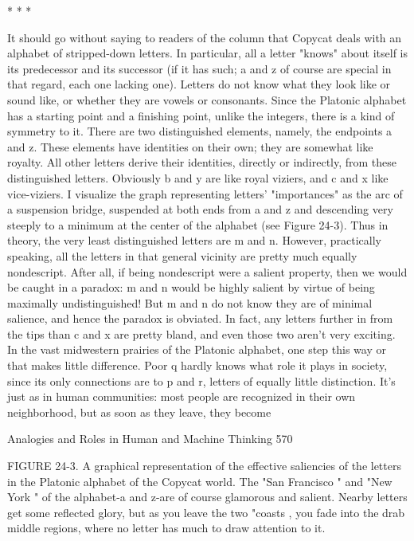                                          *   *   *

         It should go without saying to readers of the column that Copycat deals with
an alphabet of stripped-down letters. In particular, all a letter "knows" about itself is
its predecessor and its successor (if it has such; a and z of course are special in that
regard, each one lacking one). Letters do not know what they look like or sound like,
or whether they are vowels or consonants. Since the Platonic alphabet has a starting
point and a finishing point, unlike the integers, there is a kind of symmetry to it. There
are two distinguished elements, namely, the endpoints a and z. These elements have
identities on their own; they are somewhat like royalty. All other letters derive their
identities, directly or indirectly, from these distinguished letters. Obviously b and y
are like royal viziers, and c and x like vice-viziers.
         I visualize the graph representing letters' "importances" as the arc of a
suspension bridge, suspended at both ends from a and z and descending very steeply
to a minimum at the center of the alphabet (see Figure 24-3). Thus in theory, the very
least distinguished letters are m and n. However, practically speaking, all the letters in
that general vicinity are pretty much equally nondescript. After all, if being
nondescript were a salient property, then we would be caught in a paradox: m and n
would be highly salient by virtue of being maximally undistinguished! But m and n do
not know they are of minimal salience, and hence the paradox is obviated. In fact, any
letters further in from the tips than c and x are pretty bland, and even those two aren't
very exciting.
         In the vast midwestern prairies of the Platonic alphabet, one step this way or
that makes little difference. Poor q hardly knows what role it plays in society, since its
only connections are to p and r, letters of equally little distinction. It's just as in human
communities: most people are recognized in their own neighborhood, but as soon as
they leave, they become




Analogies and Roles in Human and Machine Thinking                                       570

FIGURE 24-3. A graphical representation of the effective saliencies of the letters in
the Platonic alphabet of the Copycat world. The "San Francisco " and "New York " of
the alphabet-a and z-are of course glamorous and salient. Nearby letters get some
reflected glory, but as you leave the two "coasts , you fade into the drab middle
regions, where no letter has much to draw attention to it.

